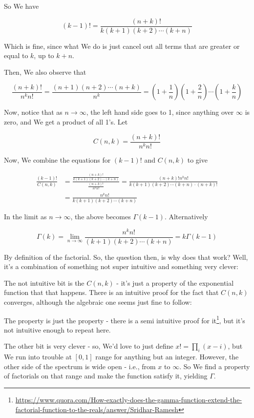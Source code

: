 \documentclass{article}
\begin{document}
		So We have
		
		\[ (k-1)! = \frac{(n+k)!}{k(k+1)(k+2)\cdots (k+n)} \]
		
		Which is fine, since what We do is just cancel out all terms that are greater or equal to $k$, up to $k+n$.
		
		Then, We also observe that
		
		\[ \frac{(n+k)!}{n^kn!} = \frac{(n+1)(n+2)\cdots (n+k)}{n^k} = \left(1+\frac{1}{n} \right)\left(1+\frac{2}{n} \right)\cdots \left(1+\frac{k}{n} \right) \]
		
		Now, notice that as $n\to\infty$, the left hand side goes to 1, since anything over $\infty$ is zero, and We get a product of all 1's. Let
		
		\[ C(n, k) = \frac{(n+k)!}{n^kn!} \]
		
		Now, We combine the equations for $(k-1)!$ and $C(n, k)$ to give
		
		\begin{align*}
		\frac{(k-1)!}{C(n, k)} &= \frac{\frac{(n+k)!}{k(k+1)(k+2)\cdots (k+n)}}{\frac{(n+k)!}{n^kn!}} = \frac{(n+k)!n^kn!}{k(k+1)(k+2)\cdots (k+n)\cdot(n+k)!}\\
		&= \frac{n^kn!}{k(k+1)(k+2)\cdots (k+n)}
		\end{align*}
		
		In the limit as $n\to\infty$, the above becomes $\Gamma(k-1)$. Alternatively
		
		\[ \Gamma(k) = \lim_{n\to\infty}\frac{n^kn!}{(k+1)(k+2)\cdots (k+n)} = k\Gamma(k-1) \]
		
		By definition of the factorial. So, the question then, is why does that work? Well, it's a combination of something not super intuitive and something very clever:
		
		The not intuitive bit is the $C(n, k)$ - it's just a property of the exponential function that that happens. There is an intuitive proof for the fact that $C(n, k)$ converges, although the algebraic one seems just fine to follow:
		
		The property is just the property - there is a semi intuitive proof for it\footnote{\raggedright\url{https://www.quora.com/How-exactly-does-the-gamma-function-extend-the-factorial-function-to-the-reals/answer/Sridhar-Ramesh}}, but it's not intuitive enough to repeat here. 
		
		The other bit is very clever - so, We'd love to just define $x! = \prod_i (x-i)$, but We run into trouble at $[0, 1]$ range for anything but an integer. However, the other side of the spectrum is wide open - i.e., from $x$ to $\infty$. So We find a property of factorials on that range and make the function satisfy it, yielding $\Gamma$.
		
\end{document}
